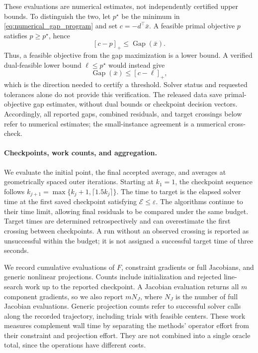 These evaluations are numerical estimates, not independently certified
upper bounds. To distinguish the two, let $p^\star$ be the minimum in
\eqref{eq:numerical_gap_program} and set $c=-d^\top\bar x$. A feasible
primal objective $p$ satisfies $p\geq p^\star$, hence
\[
 [c-p]_+\leq\operatorname{Gap}(\bar x).
\]
Thus, a feasible objective from the gap maximization is a lower bound.
A verified dual-feasible lower bound $\ell\leq p^\star$ would instead give
\[
 \operatorname{Gap}(\bar x)\leq[c-\ell]_+,
\]
which is the direction needed to certify a threshold. Solver status and
requested tolerances alone do not provide this verification. The released
data save primal-objective gap estimates, without dual bounds or checkpoint
decision vectors. Accordingly, all reported gaps, combined residuals,
and target crossings below refer to numerical estimates; the small-instance
agreement is a numerical cross-check.

\paragraph{Checkpoints, work counts, and aggregation.}
We evaluate the initial point, the final accepted average, and averages
at geometrically spaced outer iterations. Starting at $k_1=1$, the
checkpoint sequence follows
$k_{j+1}=\max\{k_j+1,\lceil1.5k_j\rceil\}$.
The time to target is the elapsed solver time at the first saved
checkpoint satisfying $\mathcal E\le\varepsilon$. The algorithms
continue to their time limit, allowing final residuals to be compared
under the same budget. Target times are determined retrospectively and
can overestimate the first crossing between checkpoints. A run without
an observed crossing is reported as unsuccessful within the budget; it
is not assigned a successful target time of three seconds.

We record cumulative evaluations of $F$, constraint gradients or full
Jacobians, and generic nonlinear projections. Counts include
initialization and rejected line-search work up to the reported
checkpoint. A Jacobian evaluation returns all $m$ component gradients,
so we also report $mN_J$, where $N_J$ is the number of full Jacobian
evaluations. Generic projection counts refer to successful solver calls along the
recorded trajectory, including trials with feasible centers.
These work measures complement wall time by separating the methods'
operator effort from their constraint and projection effort. They are
not combined into a single oracle total, since the operations have
different costs.


